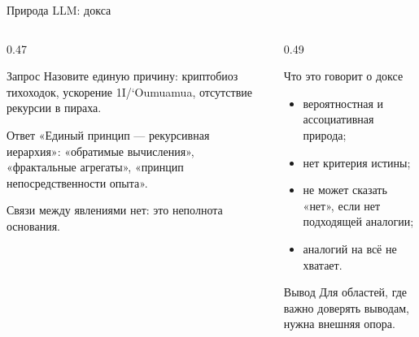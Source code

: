 \documentclass[aspectratio=169,11pt]{beamer}
\begin{document}
\begin{frame}[shrink=4]{Природа LLM: докса}
  \footnotesize
  \begin{columns}[T,onlytextwidth]
    \begin{column}{0.47\textwidth}
      \begin{block}{Запрос}
        Назовите единую причину: криптобиоз тихоходок,
        ускорение 1I/`Oumuamua, отсутствие рекурсии в пираха.
      \end{block}
      \begin{block}{Ответ}
        «Единый принцип --- рекурсивная иерархия»:
        «обратимые вычисления», «фрактальные агрегаты»,
        «принцип непосредственности опыта».
      \end{block}
      {\scriptsize Связи между явлениями нет: это неполнота основания.}
    \end{column}
    \begin{column}{0.49\textwidth}
      \begin{block}{Что это говорит о доксе}
        \begin{itemize}
          \item вероятностная и ассоциативная природа;
          \item нет критерия истины;
          \item не может сказать «нет», если нет подходящей аналогии;
          \item аналогий на всё не хватает.
        \end{itemize}
      \end{block}
      \begin{block}{Вывод}
        Для областей, где важно доверять выводам, нужна внешняя опора.
      \end{block}
    \end{column}
  \end{columns}
\end{frame}
\end{document}
